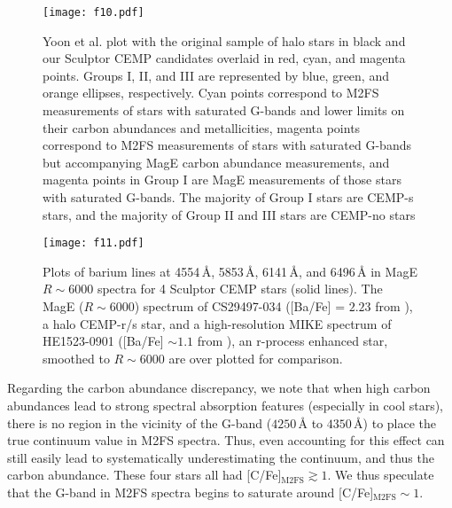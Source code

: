 \documentclass{emulateapj-rtx4}
\begin{document}

\begin{figure}[!htbp]
\centering
\texttt{[image: f10.pdf]}
\caption{Yoon et al. plot with the original sample of halo stars in black and our Sculptor CEMP candidates overlaid in red, cyan,
and magenta points. Groups I, II, and III are represented by blue, green, and orange ellipses, respectively.
Cyan points correspond to M2FS measurements of stars with saturated G-bands and lower limits on their carbon abundances and metallicities, 
magenta points correspond to M2FS measurements of stars with saturated G-bands but accompanying MagE carbon abundance measurements, and magenta points in Group I are MagE measurements of those stars with saturated G-bands. 
The majority of Group I stars are CEMP-s stars, and the majority of Group II and III stars are CEMP-no stars}
\label{fig:ybplot}
\end{figure}



\begin{figure*}[!t]
\centering
\texttt{[image: f11.pdf]}
\caption{Plots of barium lines at 4554\,\AA, 5853\,\AA, 6141\,\AA, and 6496\,\AA\,\,in MagE $R\sim6000$ spectra for 4 Sculptor CEMP 
stars (solid lines). The MagE ($R\sim6000$) spectrum of CS29497-034 ([Ba/Fe] = $2.23$ from \citealt{abc+07}), a halo CEMP-r/s star, 
and a high-resolution MIKE spectrum of HE1523-0901 ([Ba/Fe] $\sim 1.1$ from \citealt{fcn+07}), an
r-process enhanced star, smoothed to $R\sim6000$ are over plotted for comparison.}
\vspace{0.50cm}
\label{fig:balines}
\end{figure*}


Regarding the carbon abundance discrepancy, we note that when high carbon abundances lead to strong spectral absorption features (especially in cool stars), there is no region in the vicinity of the G-band ($4250$\,\AA\,\,to $4350$\,\AA) 
to place the true continuum value in M2FS spectra. Thus, even accounting for this effect can still easily lead to systematically underestimating the continuum, and thus the carbon abundance. These four stars all had [C/Fe]$_{\text{M2FS}} \gtrsim 1$. We thus speculate that the G-band in M2FS spectra begins to saturate around [C/Fe]$_{\text{M2FS}} \sim 1$.
\end{document}
